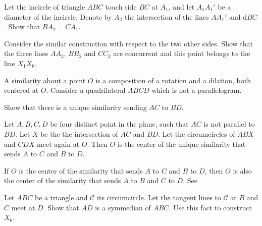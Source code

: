     \begin{exercise}
      Let the incircle of triangle $ABC$ touch side $ BC$ at $A_1$, and let $A_1 A_1'$ be a diameter of the incircle.
Denote by $A_2$ the intersection of the lines $AA_1'$  and d$BC$. Show that   $BA_2  = CA_1$.

Consider the similar construction with respect to the two other sides.
Show that the three lines $AA_2$, $BB_2$ and $CC_2$ are concurrent and this point belongs to the line $X_1X_6$.


 \end{exercise}
 
 \begin{exercise}
 A    similarity    about a point $O$   is a composition of a
rotation and a dilation, both centered at $O$.
Consider a quadrilateral   $ABCD$  which is not a parallelogram.  

Show that there is a unique   similarity sending $AC$ to $BD$. 

Let $A, B, C, D$  be four distinct point in the plane, such that $AC$ is not parallel to $BD$. Let $X$ be the the intersection of
  $ AC$ and $BD$.  Let the circumcircles of $ABX $ and $CDX$ meet again at $O$. Then $O$  is the
center of the unique   similarity that sends $A $ to $C$ and $B $ to $D$.

If $O$ is the center of the   similarity that sends $A$ to $C$ and $B$ to $D$, then $O$ is also the center
of the   similarity that sends $A$ to $B$ and $C$ to $  D$.
See \cite{zhao-2021}
\end{exercise}

\begin{exercise}
Let $ABC$ be a triangle and $\mathcal{C}$  its circumcircle. Let the tangent lines to $\mathcal{C}$  at $B$ and $C$ meet at $D$.
Show that   $AD $ is  a symmedian of $ABC$.
 Use this fact to construct $X_6$.
\end{exercise}